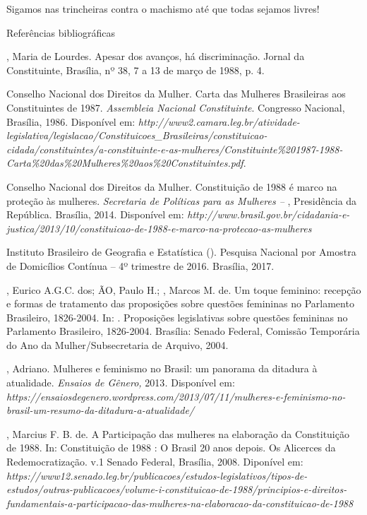 Sigamos nas trincheiras contra o machismo até que todas sejamos livres!

Referências bibliográficas

, Maria de Lourdes. Apesar dos avanços, há discriminação. Jornal
da Constituinte, Brasília, nº 38, 7 a 13 de março de 1988, p. 4.

Conselho Nacional dos Direitos da Mulher. Carta das Mulheres Brasileiras
aos Constituintes de 1987. \emph{Assembleia Nacional Constituinte}.
Congresso Nacional, Brasília, 1986. Disponível em:
\emph{http://www2.camara.leg.br/atividade-legislativa/legislacao/Constituicoes\_Brasileiras/constituicao-cidada/constituintes/a-constituinte-e-as-mulheres/Constituinte\%201987-1988-Carta\%20das\%20Mulheres\%20aos\%20Constituintes.pdf}.

Conselho Nacional dos Direitos da Mulher. Constituição de 1988
é marco na proteção às mulheres. \emph{Secretaria de Políticas para as
Mulheres -- }, Presidência da República. Brasília, 2014.
Disponível em:
\emph{http://www.brasil.gov.br/cidadania-e-justica/2013/10/constituicao-de-1988-e-marco-na-protecao-as-mulheres}

Instituto Brasileiro de Geografia e Estatística (). Pesquisa
Nacional por Amostra de Domicílios Contínua -- 4º trimestre de 2016.
Brasília, 2017.

, Eurico A.G.C. dos; ÃO, Paulo H.; , Marcos M. de. Um
toque feminino: recepção e formas de tratamento das proposições sobre
questões femininas no Parlamento Brasileiro, 1826-2004. In: 
. Proposições legislativas sobre questões femininas no Parlamento
Brasileiro, 1826-2004. Brasília: Senado Federal, Comissão Temporária do
Ano da Mulher/Subsecretaria de Arquivo, 2004.

, Adriano. Mulheres e feminismo no Brasil: um panorama da
ditadura à atualidade. \emph{Ensaios de Gênero,} 2013\emph{.} Disponível
em: \emph{https://ensaiosdegenero.wordpress.com/2013/07/11/mulheres-e-feminismo-no-brasil-um-resumo-da-ditadura-a-atualidade/}

, Marcius F. B. de. A Participação das mulheres na elaboração da
Constituição de 1988. In: Constituição de 1988 : O Brasil 20 anos
depois. Os Alicerces da Redemocratização. v.1 Senado Federal, Brasília,
2008. Diponível em: \emph{https://www12.senado.leg.br/publicacoes/estudos-legislativos/tipos-de-estudos/outras-publicacoes/volume-i-constituicao-de-1988/principios-e-direitos-fundamentais-a-participacao-das-mulheres-na-elaboracao-da-constituicao-de-1988}
